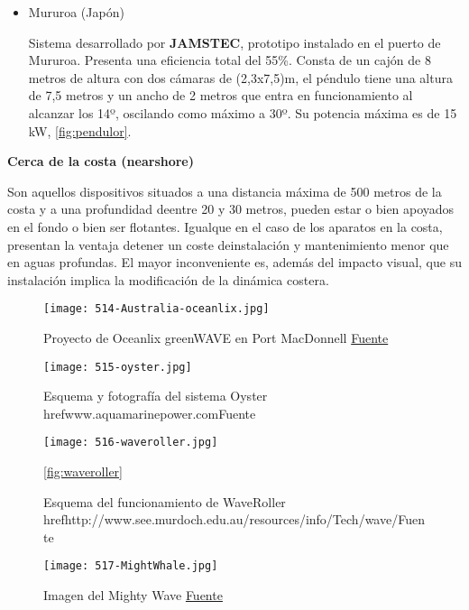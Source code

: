 \begin{itemize}
  \begin{itemize}
  \item
    Mururoa (Japón)

    Sistema desarrollado por \textbf{JAMSTEC}, prototipo instalado en el
    puerto de Mururoa. Presenta una eficiencia total del 55\%. Consta de
    un cajón de 8 metros de altura con dos cámaras de (2,3x7,5)m, el
    péndulo tiene una altura de 7,5 metros y un ancho de 2 metros que
    entra en funcionamiento al alcanzar los 14º, oscilando como máximo a
    30º. Su potencia máxima es de 15 kW, \autoref{fig:pendulor}.

  \end{itemize}
\end{itemize}

\textbf{Cerca de la costa (nearshore)}

Son aquellos dispositivos situados a una distancia máxima de 500 metros
de la costa y a una profundidad deentre 20 y 30 metros, pueden estar o
bien apoyados en el fondo o bien ser flotantes. Igualque en el caso de
los aparatos en la costa, presentan la ventaja detener un coste
deinstalación y mantenimiento menor que en aguas profundas. El mayor
inconveniente es, además del impacto visual, que su instalación implica
la modificación de la dinámica costera.

\begin{figure}
\centering
\texttt{[image: 514-Australia-oceanlix.jpg]}
\caption[Proyecto de Oceanlix greenWAVE en Port MacDonnell]{Proyecto de Oceanlix greenWAVE en Port MacDonnell \href{https://www.offshorewind.biz/2013/09/04/australia-construction-starts-on-oceanlinxs-wave-energy-project/}{Fuente}}
\label{fig:Australia-oceanlix}
\end{figure}

\begin{figure}
\centering
\texttt{[image: 515-oyster.jpg]}
\caption[Esquema y fotografía del sistema Oyster]{Esquema y fotografía del sistema Oyster href{www.aquamarinepower.com}{Fuente}}
\label{fig:oyster}
\end{figure}

\begin{figure}
\centering
\texttt{[image: 516-waveroller.jpg]}
\caption[Esquema del funcionamiento de WaveRoller]{Esquema del funcionamiento de WaveRoller href{http://www.see.murdoch.edu.au/resources/info/Tech/wave/}{Fuente}}
\autoref{fig:waveroller}
\end{figure}

\begin{figure}
\centering
\texttt{[image: 517-MightWhale.jpg]}
\caption[Imagen del Mighty Wave]{Imagen del Mighty Wave \href{http://www.jamstec.go.jp/}{Fuente}}
\label{fig:MightWhale}
\end{figure}


